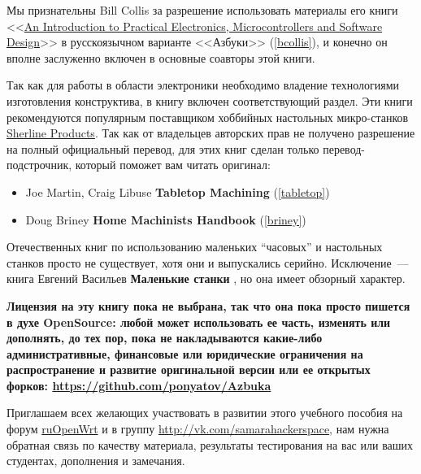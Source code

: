 \bigskip
Мы признательны Bill Collis за разрешение использовать материалы его книги
<<\href{www.techideas.co.nz}{An Introduction to
Practical Electronics,
Microcontrollers and
Software Design}>> \cite{bcollis} в
русскоязычном варианте <<Азбуки>> (\ref{bcollis}), и конечно он вполне
заслуженно включен в основные соавторы этой книги.

\bigskip
Так как для работы в области электроники необходимо владение технологиями
изготовления конструктива, в книгу включен соответствующий раздел. 
Эти книги рекомендуются популярным поставщиком хоббийных настольных
микро-станков \href{http://sherline.com/}{Sherline Products}. Так как от
владельцев авторских прав не получено разрешение на полный официальный перевод,
для этих книг сделан только перевод-подстрочник, который поможет вам читать
оригинал:
\begin{itemize}
  \item Joe Martin, Craig Libuse \textbf{Tabletop Machining}
  \cite{tabletop} (\ref{tabletop})
  \item Doug Briney \textbf{Home Machinists Handbook}
  \cite{briney} (\ref{briney})
\end{itemize}

Отечественных книг по использованию маленьких ``часовых'' и настольных станков
просто не существует, хотя они и выпускались серийно. Исключение\ --- книга
Евгений Васильев \textbf{Маленькие станки} \cite{vasil}, но она имеет обзорный
характер.

\bigskip
\textbf{Лицензия на эту книгу пока не выбрана, так что она пока просто пишется в
духе OpenSource: любой может использовать ее часть, изменять или дополнять, до
тех пор, пока не накладываются какие-либо административные, финансовые или
юридические ограничения на распространение и развитие оригинальной версии или ее
открытых форков: \url{https://github.com/ponyatov/Azbuka}}
\bigskip

Приглашаем всех желающих участвовать в развитии этого учебного пособия на форум
\href{https://groups.google.com/forum/\#!forum/openwrt2ru}{ruOpenWrt} и в группу
\url{http://vk.com/samarahackerspace}, нам нужна обратная связь по качеству
материала, результаты тестирования на вас или ваших студентах, дополнения и
замечания.
